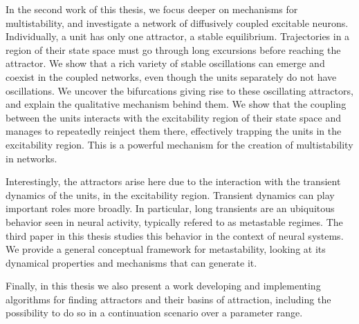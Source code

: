 In the second work of this thesis, we focus deeper on mechanisms for multistability, and investigate a network of diffusively coupled excitable neurons. Individually, a unit has only one attractor, a stable equilibrium. Trajectories in a region of their state space must go through long excursions before reaching the attractor. We show that a rich variety of stable oscillations can emerge and coexist in the coupled networks, even though the units separately do not have oscillations. We uncover the bifurcations giving rise to these oscillating attractors, and explain the qualitative mechanism behind them. We show that the coupling between the units interacts with the excitability region of their state space and manages to repeatedly reinject them there, effectively trapping the units in the excitability region. This is a powerful mechanism for the creation of multistability in networks. 

Interestingly, the attractors arise here due to the interaction with the transient dynamics of the units, in the excitability region. Transient dynamics can play important roles more broadly. In particular, long transients are an ubiquitous behavior seen in neural activity, typically refered to as metastable regimes. The third paper in this thesis studies this behavior in the context of neural systems. We provide a general conceptual framework for metastability, looking at its dynamical properties and mechanisms that can generate it.

Finally, in this thesis we also present a work developing and implementing algorithms for finding attractors and their basins of attraction, including the possibility to do so in a continuation scenario over a parameter range. 






